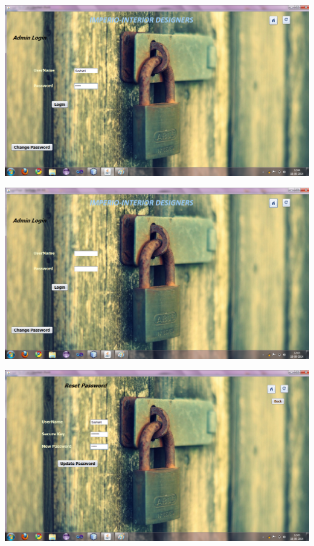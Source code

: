 \documentclass[12pt,a4paper]{report}
\begin{document}
\begin{center}
\includegraphics[scale=0.45]{9_1.png}
\end{center}
\begin{center}
\includegraphics[scale=0.45]{10.png}
\end{center}
\begin{center}
\includegraphics[scale=0.45]{11.png}
\end{center}
\end{document}
